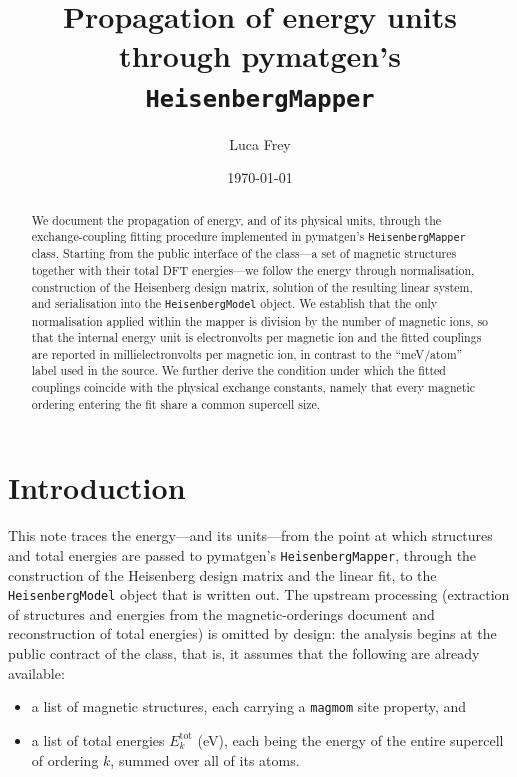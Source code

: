 \documentclass[11pt]{article}
\title{Propagation of energy units through pymatgen's
\texttt{HeisenbergMapper}}
\author{Luca Frey}
\date{\today}
\newcommand{\code}[1]{\texttt{\def\_{\textunderscore\allowbreak}#1}}
\begin{document}
\maketitle

\begin{abstract}
\noindent
We document the propagation of energy, and of its physical units, through the
exchange-coupling fitting procedure implemented in pymatgen's
\code{HeisenbergMapper} class. Starting from the public interface of the
class---a set of magnetic structures together with their total DFT
energies---we follow the energy through normalisation, construction of the
Heisenberg design matrix, solution of the resulting linear system, and
serialisation into the \code{HeisenbergModel} object. We establish that the
only normalisation applied within the mapper is division by the number of
magnetic ions, so that the internal energy unit is electron\-volts per magnetic
ion and the fitted couplings are reported in milli\-electron\-volts per magnetic
ion, in contrast to the ``meV/atom'' label used in the source. We further derive
the condition under which the fitted couplings coincide with the physical
exchange constants, namely that every magnetic ordering entering the fit share a
common supercell size.
\end{abstract}

\section{Introduction}

This note traces the energy---and its units---from the point at which structures
and total energies are passed to pymatgen's \code{HeisenbergMapper}, through the
construction of the Heisenberg design matrix and the linear fit, to the
\code{HeisenbergModel} object that is written out. The upstream processing
(extraction of structures and energies from the magnetic-orderings document and
reconstruction of total energies) is omitted by design: the analysis begins at
the public contract of the class, that is, it assumes that the following are
already available:

\begin{itemize}
  \item a list of magnetic structures, each carrying a \code{magmom} site
        property, and
  \item a list of total energies $E_k^{\mathrm{tot}}$ (eV), each being the energy
        of the entire supercell of ordering $k$, summed over all of its atoms.
\end{itemize}
\end{document}
